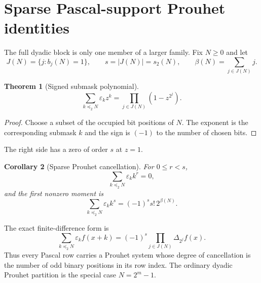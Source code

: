 \documentclass[11pt,oneside]{article}
\newtheorem{theorem}{Theorem}[section]
\newtheorem{corollary}[theorem]{Corollary}
\theoremstyle{definition}
\theoremstyle{remark}
\newcommand{\bitsum}{s_2}
\newcommand{\eps}{\varepsilon}
\newcommand{\submask}{\preccurlyeq_2}
\begin{document}
\section{Sparse Pascal-support Prouhet identities}\label{p3:sec:sparse-prouhet}

The full dyadic block is only one member of a larger family.  Fix $N\ge0$ and
let
\begin{equation}\label{p3:eq:occupied-bits}
 J(N)=\{j:b_j(N)=1\},
 \qquad s=|J(N)|=\bitsum(N),
 \qquad \beta(N)=\sum_{j\in J(N)}j.
\end{equation}

\begin{theorem}[Signed submask polynomial]\label{p3:thm:signed-submask-product}
\begin{equation}\label{p3:eq:signed-submask-product}
 \boxed{\quad
 \sum_{k\submask N}\eps_kz^k
 =\prod_{j\in J(N)}(1-z^{2^j}).
 \quad}
\end{equation}
\end{theorem}

\begin{proof}
Choose a subset of the occupied bit positions of $N$.  The exponent is the
corresponding submask $k$ and the sign is $(-1)$ to the number of chosen bits.
\end{proof}

The right side has a zero of order $s$ at $z=1$.

\begin{corollary}[Sparse Prouhet cancellation]\label{p3:cor:sparse-prouhet}
For $0\le r<s$,
\begin{equation}\label{p3:eq:sparse-prouhet}
 \sum_{k\submask N}\eps_kk^r=0,
\end{equation}
and the first nonzero moment is
\begin{equation}\label{p3:eq:sparse-first-moment}
 \sum_{k\submask N}\eps_kk^s
 =(-1)^s s!\,2^{\beta(N)}.
\end{equation}
\end{corollary}

The exact finite-difference form is
\begin{equation}\label{p3:eq:sparse-finite-difference}
 \sum_{k\submask N}\eps_kf(x+k)
 =(-1)^s\prod_{j\in J(N)}\Delta_{2^j}f(x).
\end{equation}
Thus every Pascal row carries a Prouhet system whose degree of cancellation is
the number of odd binary positions in its row index.  The ordinary dyadic
Prouhet partition is the special case $N=2^m-1$.
\end{document}
